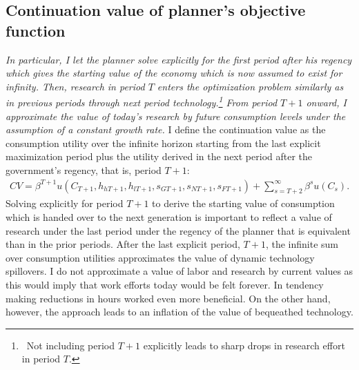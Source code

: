 \subsection{Continuation value of planner's objective function}\label{app:PV}
\textit{In particular, I let the planner solve explicitly for the first period after his regency which gives the starting value of the economy which is now assumed to exist for infinity. 
Then, research in period $T$ enters the optimization problem similarly as in previous periods through next period technology.\footnote{\ Not including period $T+1$ explicitly leads to sharp drops in research effort in period $T$. }  From period $T+1$ onward, I approximate the value of today's research by future consumption levels under the assumption of a constant growth rate. 
}
I define the continuation value as the consumption utility over the infinite horizon starting from the last explicit maximization period plus the utility derived in the next period after the government's regency, that is, period $T+1$:
\begin{align}
CV=\beta^{T+1} u(C_{T+1},h_{h{T+1}}, h_{l{T+1}}, s_{G{T+1}}, s_{N{T+1}}, s_{F{T+1}})+\sum_{s=T+2}^{\infty} \beta^{s}u(C_s). %
\end{align}
Solving explicitly for period $T+1$ to derive the starting value of consumption which is handed over to the next generation is important to reflect a value of research under the last period under the regency of the planner that is equivalent than in the prior periods.
After the last explicit period, $T+1$, the infinite sum over consumption utilities approximates the value of dynamic technology spillovers. 
I do not approximate a value of labor and research by current values as this would imply that work efforts today would be felt forever. In tendency making reductions in hours worked even more beneficial. On the other hand, however, the approach leads to an inflation of the value of bequeathed technology. 

